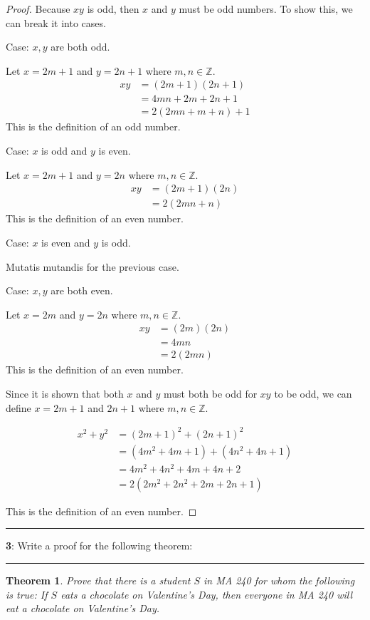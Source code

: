 \documentclass[11pt]{article}
\newtheorem{theorem}{Theorem}
\newcommand\question[2]{\vspace{.25in}\hrule\textbf{#1}: #2\vspace{.5em}\hrule\vspace{.10in}}
\newcommand{\Z}{\mathbb{Z}}
\begin{document}
\begin{proof}
	Because $xy$ is odd, then $x$ and $y$ must be odd numbers. To show this, we can break it into cases.

	Case: $x, y$ are both odd.

	Let $x=2m+1$ and $y=2n+1$ where $m,n \in \Z$.
	\begin{align*}
		xy &= (2m+1)(2n+1)\\
		&= 4mn + 2m + 2n + 1\\
		&= 2 (2mn + m + n) + 1
	\end{align*}
	This is the definition of an odd number.

	Case: $x$ is odd and $y$ is even.
	
	Let $x=2m+1$ and $y=2n$ where $m,n \in \Z$.
	\begin{align*}
		xy &= (2m+1)(2n)\\
		&= 2(2mn+n)
	\end{align*}
	This is the definition of an even number.
	
	Case: $x$ is even and $y$ is odd.
	
	Mutatis mutandis for the previous case.
	
	Case: $x,y$ are both even.
	
	Let $x=2m$ and $y=2n$ where $m,n \in \Z$.
	\begin{align*}
		xy &= (2m)(2n)\\
		&= 4mn\\
		&= 2(2mn)
	\end{align*}
	This is the definition of an even number.

	Since it is shown that both $x$ and $y$ must both be odd for $xy$ to be odd, we can define $x=2m+1$ and $2n+1$ where $m, n \in \Z$.

	\begin{align*}
		x^2+y^2 &= (2m+1)^2 + (2n+1)^2\\
		&= (4m^2 + 4m + 1) + (4n^2 + 4n + 1)\\
		&= 4m^2+4n^2+4m+4n+2\\
		&= 2(2m^2+2n^2+2m+2n+1)
	\end{align*}

	This is the definition of an even number.

\end{proof}


\question{3}{Write a proof for the following theorem:}

\begin{theorem}
	Prove that there is a student $S$ in MA 240 for whom the following is true: If $S$ eats a chocolate on Valentine's Day, then \textit{everyone} in MA 240 will eat a chocolate on Valentine's Day.
\end{theorem}
\end{document}
